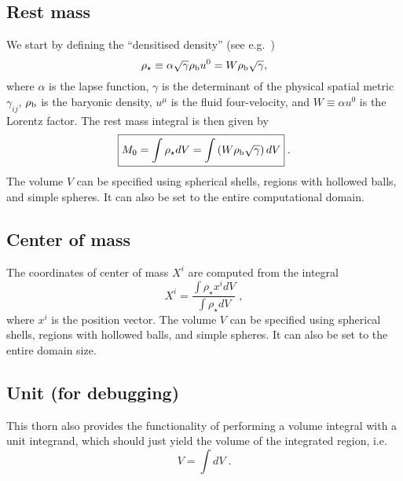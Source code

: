 \subsection{Rest mass}
\label{sec:rest_mass}
We start by defining the ``densitised density'' (see e.g.~\cite{duez2005relativistic})
\begin{equation}
\rho_{\star} \equiv \alpha\sqrt{\gamma}\rho_{\rm b} u^{0} = W\rho_{\rm b}\sqrt{\gamma},
\end{equation}
where $\alpha$ is the lapse function, $\gamma$ is the determinant of
the physical spatial metric $\gamma_{ij}$, $\rho_{\rm b}$ is the baryonic
density, $u^{\mu}$ is the fluid four-velocity, and $W\equiv\alpha u^{0}$
is the Lorentz factor. The rest mass integral is then given by
\begin{equation}
\boxed{ M_{0} = \int \rho_{\star} dV = \int \left(W\rho_{\rm b}\sqrt{\gamma}\right)dV }\; .
\end{equation}
The volume $V$ can be specified using spherical shells, regions with hollowed balls,
and simple spheres. It can also be set to the entire computational domain.

\subsection{Center of mass}
\label{sec:com}

The coordinates of center of mass $X^{i}$ are computed from the integral
\begin{equation}
\boxed{ X^{i} = \frac{\int \rho_{\star} x^{i}dV}{\int \rho_{\star} dV} }\; ,
\end{equation}
where $x^{i}$ is the position vector. The volume $V$ can be specified using spherical shells,
regions with hollowed balls, and simple spheres. It can also be set to the entire domain size.

\subsection{Unit (for debugging)}
\label{sec:unit}

This thorn also provides the functionality of performing a volume
integral with a unit integrand, which should just yield the volume
of the integrated region, i.e.
\begin{equation}
\boxed{ V = \int dV }\; .
\end{equation}

